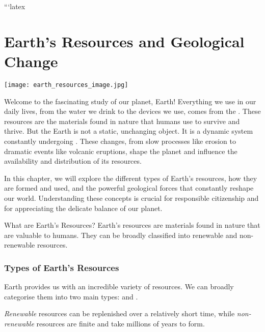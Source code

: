 ```latex
\chapter{Earth's Resources and Geological Change}

\begin{marginfigure}
\texttt{[image: earth\_resources\_image.jpg]}
\caption*{\textit{Image of diverse Earth resources: minerals, forests, water, and fossil fuels.}}
\end{marginfigure}

\FloatBarrier

Welcome to the fascinating study of our planet, Earth!  Everything we use in our daily lives, from the water we drink to the devices we use, comes from the .  These resources are the materials found in nature that humans use to survive and thrive.  But the Earth is not a static, unchanging object. It is a dynamic system constantly undergoing .  These changes, from slow processes like erosion to dramatic events like volcanic eruptions, shape the planet and influence the availability and distribution of its resources.

In this chapter, we will explore the different types of Earth's resources, how they are formed and used, and the powerful geological forces that constantly reshape our world.  Understanding these concepts is crucial for responsible citizenship and for appreciating the delicate balance of our planet.

\begin{keyconcept}{What are Earth's Resources?}
Earth's resources are materials found in nature that are valuable to humans. They can be broadly classified into renewable and non-renewable resources.
\end{keyconcept}

\FloatBarrier

\subsection{Types of Earth's Resources}

Earth provides us with an incredible variety of resources. We can broadly categorise them into two main types:  and .

\begin{marginnote}
\textit{Renewable} resources can be replenished over a relatively short time, while \textit{non-renewable} resources are finite and take millions of years to form.
\end{marginnote}

